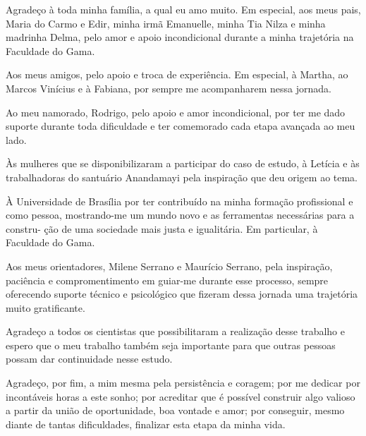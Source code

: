 \begin{agradecimentos}

Agradeço à toda minha família, a qual eu amo muito. Em especial, aos meus pais,
Maria do Carmo e Edir, minha irmã Emanuelle, minha Tia Nilza e minha madrinha
Delma, pelo amor e apoio incondicional durante a minha trajetória na Faculdade do Gama.

Aos meus amigos, pelo apoio e troca de experiência. Em especial, à Martha, ao Marcos
Vinícius e à Fabiana, por sempre me acompanharem nessa jornada. 

Ao meu namorado, Rodrigo, pelo apoio e amor incondicional, por ter me dado
suporte durante toda dificuldade e ter comemorado cada etapa avançada ao meu lado.

Às mulheres que se disponibilizaram a participar do caso de estudo, à Letícia e às trabalhadoras do santuário Anandamayi pela inspiração que deu origem ao tema.

À Universidade de Brasília por ter contribuído na minha formação profissional e
como pessoa, mostrando-me um mundo novo e as ferramentas necessárias para a constru-
ção de uma sociedade mais justa e igualitária. Em particular, à Faculdade do Gama.

Aos meus orientadores, Milene Serrano e Maurício Serrano, pela inspiração, paciência e compromentimento 
em guiar-me durante esse processo, sempre oferecendo suporte técnico e psicológico que fizeram 
dessa jornada uma trajetória muito gratificante. 

Agradeço a todos os cientistas que possibilitaram a realização desse trabalho e espero que 
o meu trabalho também seja importante para que outras pessoas possam dar continuidade nesse 
estudo. 

Agradeço, por fim, a mim mesma pela persistência e coragem; por me dedicar por
incontáveis horas a este sonho; por acreditar que é possível construir algo valioso a partir
da união de oportunidade, boa vontade e amor; por conseguir, mesmo diante de tantas
dificuldades, finalizar esta etapa da minha vida.

\end{agradecimentos}
